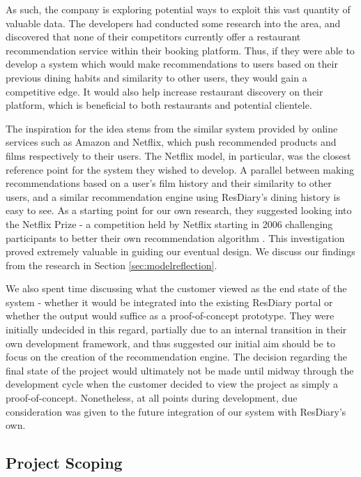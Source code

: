 \documentclass{l3proj}
\begin{document}
As such, the company is exploring potential ways to exploit this vast quantity of valuable data. The developers had conducted some research into the area, and discovered that none of their competitors currently offer a restaurant recommendation service within their booking platform. Thus, if they were able to develop a system which would make recommendations to users based on their previous dining habits and similarity to other users, they would gain a competitive edge. It would also help increase restaurant discovery on their platform, which is beneficial to both restaurants and potential clientele. 

The inspiration for the idea stems from the similar system provided by online services such as Amazon and Netflix, which push recommended products and films respectively to their users. The Netflix model, in particular, was the closest reference point for the system they wished to develop. A parallel between making recommendations based on a user's film history and their similarity to other users, and a similar recommendation engine using ResDiary's dining history is easy to see. As a starting point for our own research, they suggested looking into the Netflix Prize - a competition held by Netflix starting in 2006 challenging participants to better their own recommendation algorithm \cite{NetflixPrize}. This investigation proved extremely valuable in guiding our eventual design. We discuss our findings from the research in Section \ref{sec:modelreflection}.

We also spent time discussing what the customer viewed as the end state of the system - whether it would be integrated into the existing ResDiary portal or whether the output would suffice as a proof-of-concept prototype. They were initially undecided in this regard, partially due to an internal transition in their own development framework, and thus suggested our initial aim should be to focus on the creation of the recommendation engine. The decision regarding the final state of the project would ultimately not be made until midway through the development cycle when the customer decided to view the project as simply a proof-of-concept. Nonetheless, at all points during development, due consideration was given to the future integration of our system with ResDiary's own. 


\subsection{Project Scoping}
\label{sec:ourinitobjectives}
%
\end{document}
